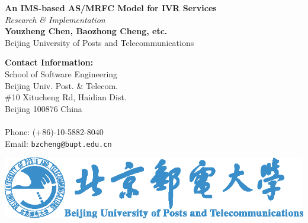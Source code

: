 \documentclass[a0,landscape]{a0poster}
\begin{document}
\begin{minipage}[b]{0.55\linewidth}
\veryHuge \color{NavyBlue} \textbf{An IMS-based AS/MRFC Model for IVR Services} \color{Black}\\
\Huge\textit{Research \& Implementation}\\[1cm]
\LARGE \textbf{Youzheng Chen, Baozhong Cheng, etc.}\\
\LARGE Beijing University of Posts and Telecommunications\\
\end{minipage}
%
\begin{minipage}[b]{0.25\linewidth}
\color{DarkSlateGray}\Large \textbf{Contact Information:}\\
School of Software Engineering\\
Beijing Univ. Post. \& Telecom.\\
\#10 Xitucheng Rd, Haidian Dist.\\
Beijing 100876 China\\\\
Phone: (+86)-10-5882-8040\\
Email: \texttt{bzcheng@bupt.edu.cn}\\
\end{minipage}
%
\begin{minipage}[b]{0.19\linewidth}
\includegraphics[width=21cm]{logo.eps}
\end{minipage}

\vspace{1cm}
\end{document}

